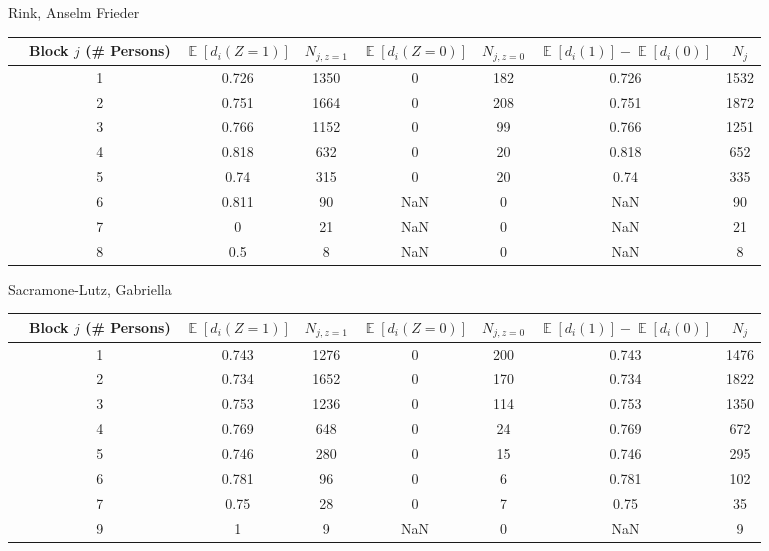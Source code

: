 \documentclass[11pt,notitlepage]{article}
\def\E{\mathop{\mathbb{E}}}
\begin{document}
Rink, Anselm Frieder
\begin{table}[h!]\small
\begin{center}
\begin{tabular}{rc|cc|cc|cc}
  \hline
 & Block $j$ (\# Persons) & $\E[d_i(Z=1)]$ & $N_{j, z=1}$ & $\E[d_i(Z=0)]$ & $N_{j, z=0}$ & $\E[d_i(1)]-\E[d_i(0)]$ & $N_j$ \\ 
  \hline
  & 1 & 0.726 & 1350 & 0 & 182 & 0.726 & 1532 \\ 
  & 2 & 0.751 & 1664 & 0 & 208 & 0.751 & 1872 \\ 
  & 3 & 0.766 & 1152 & 0 & 99 & 0.766 & 1251 \\ 
  & 4 & 0.818 & 632 & 0 & 20 & 0.818 & 652 \\ 
  & 5 & 0.74 & 315 & 0 & 20 & 0.74 & 335 \\ 
  & 6 & 0.811 & 90 & NaN & 0 & NaN & 90 \\ 
  & 7 & 0 & 21 & NaN & 0 & NaN & 21 \\ 
  & 8 & 0.5 & 8 & NaN & 0 & NaN & 8 \\ 
   \hline
\end{tabular}
\end{center}
\end{table}


Sacramone-Lutz, Gabriella
\begin{table}[h!]\small
\begin{center}
\begin{tabular}{rc|cc|cc|cc}
  \hline
 & Block $j$ (\# Persons) & $\E[d_i(Z=1)]$ & $N_{j, z=1}$ & $\E[d_i(Z=0)]$ & $N_{j, z=0}$ & $\E[d_i(1)]-\E[d_i(0)]$ & $N_j$ \\ 
  \hline
 & 1 & 0.743 & 1276 & 0 & 200 & 0.743 & 1476 \\ 
 & 2 & 0.734 & 1652 & 0 & 170 & 0.734 & 1822 \\ 
 & 3 & 0.753 & 1236 & 0 & 114 & 0.753 & 1350 \\ 
 & 4 & 0.769 & 648 & 0 & 24 & 0.769 & 672 \\ 
 & 5 & 0.746 & 280 & 0 & 15 & 0.746 & 295 \\ 
 & 6 & 0.781 & 96 & 0 & 6 & 0.781 & 102 \\ 
 & 7 & 0.75 & 28 & 0 & 7 & 0.75 & 35 \\ 
 & 9 & 1 & 9 & NaN & 0 & NaN & 9 \\ 
   \hline
\end{tabular}
\end{center}
\end{table}
\end{document}
